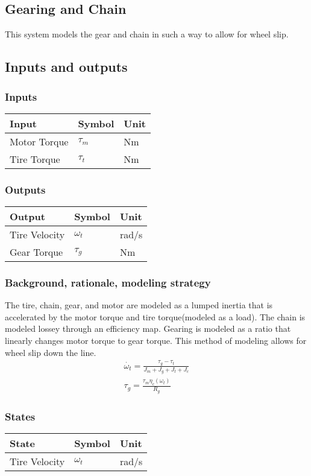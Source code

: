 \documentclass[../SimBALink.tex]{subfiles}
\begin{document}
\subsection{Gearing and Chain} This system models the gear and chain in such a way to allow for wheel slip. 

\subsection{Inputs and outputs}
	\subsubsection{Inputs}
	\begin{tabular}{ l | l | l  }
		Input					&	Symbol		&	Unit		\\	\hline
		Motor Torque			& 	$\tau_m$ 		& Nm \\
		Tire Torque				&	$\tau_t$	&	Nm
	\end{tabular}
	
	\subsubsection{Outputs}
	\begin{tabular}{ l | l | l  }
		Output					&	Symbol		&	Unit		\\	\hline
		Tire Velocity		&	$\omega_t$		&	rad/s \\
		Gear Torque			&	$\tau_g$		& Nm
	\end{tabular}

\subsubsection{Background, rationale, modeling strategy}
The tire, chain, gear, and motor are modeled as a lumped inertia that is accelerated by the motor torque and tire torque(modeled as a load). The chain is modeled lossey through an efficiency map. Gearing is modeled as a ratio that linearly changes motor torque to gear torque. This method of modeling allows for wheel slip down the line.
		\begin{gather}
		\dot{\omega_t} = \frac{\tau_g - \tau_t}{J_m + J_g + J_t + J_c} \\
		\tau_g = \frac{\tau_m \eta_c (\omega_t)}{R_g}
		\end{gather}

\subsubsection{States}
	\begin{tabular}{ l | l | l  }
		State					&	Symbol		&	Unit		\\	\hline
		Tire Velocity 			&	$\omega_t$	&	rad/s
	\end{tabular}
\end{document}
